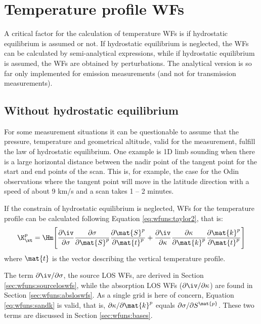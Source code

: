 \section{Temperature profile WFs}
 \label{sec:wfuns:temp}
 
 A critical factor for the calculation of temperature WFs is if
 hydrostatic equilibrium is assumed or not. If hydrostatic equilibrium
 is neglected, the WFs can be calculated by semi-analytical
 expressions, while if hydrostatic equilibrium is assumed, the WFs are
 obtained by perturbations. The analytical version is so far only
 implemented for emission measurements (and not for transmission
 measurements).


 \subsection{Without hydrostatic equilibrium}
 
 For some measurement situations it can be questionable to assume that
 the pressure, temperature and geometrical altitude, valid for the
 measurement, fulfill the law of hydrostatic equilibrium. One example
 is 1D limb sounding when there is a large horizontal distance between
 the nadir point of the tangent point for the start and end points of
 the scan. This is, for example, the case for the Odin observations
 where the tangent point will move in the latitude direction with a
 speed of about 9 km/s and a scan takes 1 -- 2 minutes.
 
 If the constrain of hydrostatic equilibrium is neglected, WFs for the
 temperature profile can be calculated following Equation
 \ref{eq:wfuns:taylor2}, that is:
 \begin{eqnarray}
    \K_{\xt}^p = \Hm \Bigg[ \frac{\partial\iv}{\partial \sigma}
                 \frac{\partial \sigma}{\partial \mat{S}^p} 
                 \frac{\partial \mat{S}^p}{\partial \mat{t}^p} +
                 \frac{\partial\iv}{\partial \kappa}
                 \frac{\partial \kappa}{\partial \mat{k}^p}
                 \frac{\partial \mat{k}^p}{\partial \mat{t}^p} \Bigg]
 \end{eqnarray}  
 where $\mat{t}$ is the vector describing the vertical temperature profile. 
 
 The term $\partial \iv/\partial \sigma$, the source LOS WFs, are
 derived in Section \ref{sec:wfuns:sourceloswfs}, while the absorption
 LOS WFs ($\partial \iv/\partial \kappa$) are found in Section
 \ref{sec:wfuns:absloswfs}. As a single grid is here of concern,
 Equation \ref{eq:wfuns:sandk} is valid, that is, $\partial\kappa/
 \partial \mat{k}^p$ equals $\partial \sigma / \partial S^\mat{p}$.
 These two terms are discussed in Section \ref{sec:wfuns:bases}.
 
